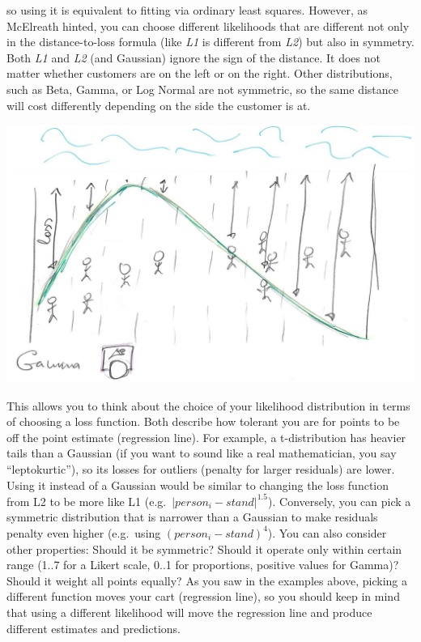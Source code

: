 \documentclass[
]{book}
\begin{document}
so using it is equivalent to fitting via ordinary least squares. However, as McElreath hinted, you can choose different likelihoods that are different not only in the distance-to-loss formula (like \emph{L1} is different from \emph{L2}) but also in symmetry. Both \emph{L1} and \emph{L2} (and Gaussian) ignore the sign of the distance. It does not matter whether customers are on the left or on the right. Other distributions, such as Beta, Gamma, or Log Normal are not symmetric, so the same distance will cost differently depending on the side the customer is at.

\begin{center}\includegraphics[width=1\linewidth]{images/loss-functions-Gamma} \end{center}

This allows you to think about the choice of your likelihood distribution in terms of choosing a loss function. Both describe how tolerant you are for points to be off the point estimate (regression line). For example, a t-distribution has heavier tails than a Gaussian (if you want to sound like a real mathematician, you say ``leptokurtic''), so its losses for outliers (penalty for larger residuals) are lower. Using it instead of a Gaussian would be similar to changing the loss function from L2 to be more like L1 (e.g.~\(|person_i - stand|^{1.5}\)). Conversely, you can pick a symmetric distribution that is narrower than a Gaussian to make residuals penalty even higher (e.g.~using \((person_i - stand)^{4}\)). You can also consider other properties: Should it be symmetric? Should it operate only within certain range (1..7 for a Likert scale, 0..1 for proportions, positive values for Gamma)? Should it weight all points equally? As you saw in the examples above, picking a different function moves your cart (regression line), so you should keep in mind that using a different likelihood will move the regression line and produce different estimates and predictions.
\end{document}
